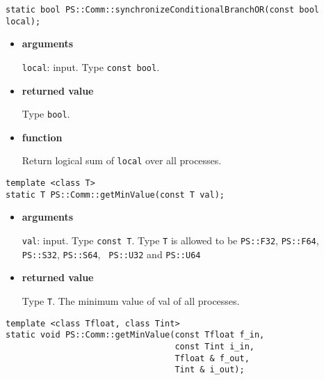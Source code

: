 
\begin{screen}
\begin{verbatim}
static bool PS::Comm::synchronizeConditionalBranchOR(const bool local);
\end{verbatim}
\end{screen}

\begin{itemize}

\item{\bf arguments}

{\tt local}: input. Type {\tt const bool}.

\item{\bf returned value}

Type {\tt bool}.

\item{\bf function}

Return logical sum of {\tt local} over all processes.

\end{itemize}


\begin{screen}
\begin{verbatim}
template <class T>
static T PS::Comm::getMinValue(const T val);
\end{verbatim}
\end{screen}

\begin{itemize}

\item{\bf arguments}

{\tt val}: input. Type {\tt const T}. Type {\tt T} is allowed to be
{\tt PS::F32}, {\tt PS::F64}, {\tt PS::S32}, {\tt PS::S64}, {\tt
PS::U32} and {\tt PS::U64}


\item{\bf returned value}

Type {\tt T}. The minimum value of val of all processes.


\end{itemize}

\begin{screen}
\begin{verbatim}
template <class Tfloat, class Tint>
static void PS::Comm::getMinValue(const Tfloat f_in,
                                  const Tint i_in,
                                  Tfloat & f_out,
                                  Tint & i_out);
\end{verbatim}
\end{screen}

